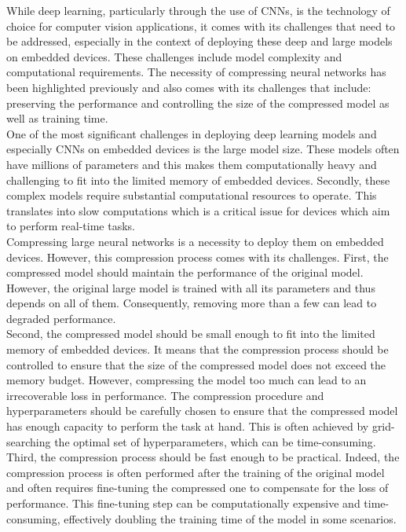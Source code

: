 While deep learning, particularly through the use of \acp{CNN}, is the
technology of choice for computer vision applications, it comes with its
challenges that need to be addressed, especially in the context of deploying
these deep and large models on embedded devices. These challenges include model
complexity and computational requirements. The necessity of compressing neural
networks has been highlighted previously and also comes with its challenges that
include: preserving the performance and controlling the size of the compressed
model as well as training time.\\

One of the most significant challenges in deploying deep learning models and
especially \acp{CNN} on embedded devices is the large model size. These models
often have millions of parameters and this makes them computationally heavy and
challenging to fit into the limited memory of embedded devices. Secondly, these
complex models require substantial computational resources to operate. This
translates into slow computations which is a critical issue for devices which
aim to perform real-time tasks.\\

Compressing large neural networks is a necessity to deploy them on embedded
devices. However, this compression process comes with its challenges. First, the
compressed model should maintain the performance of the original model. However,
the original large model is trained with all its parameters and thus depends on
all of them. Consequently, removing more than a few can lead to degraded
performance. \\

Second, the compressed model should be small enough to fit into the
limited memory of embedded devices. It means that the compression process should
be controlled to ensure that the size of the compressed model does not exceed
the memory budget. However, compressing the model too much can lead to an
irrecoverable loss in performance. The compression procedure and hyperparameters
should be carefully chosen to ensure that the compressed model has enough
capacity to perform the task at hand. This is often achieved by grid-searching
the optimal set of hyperparameters, which can be time-consuming.\\

Third, the compression process should be fast enough to be practical. Indeed,
the compression process is often performed after the training of the original
model and often requires fine-tuning the compressed one to compensate for the
loss of performance. This fine-tuning step can be computationally expensive and
time-consuming, effectively doubling the training time of the model in some
scenarios.\\


